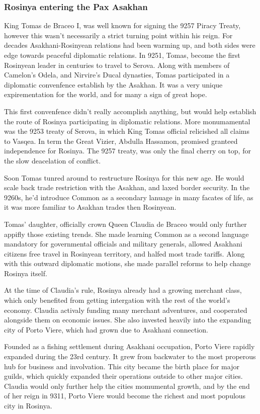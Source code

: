 \documentclass[../main.tex]{subfiles}
\begin{document}
\subsubsection{Rosinya entering the Pax Asakhan}
King Tomas de Braceo I, was well known for signing the 9257 Piracy Treaty, however this wasn't necessarily 
a strict turning point within his reign. For decades Asakhani-Rosinyean relations had been warming up,
and both sides were edge towards peaceful diplomatic relations. In 9251, Tomas, become the first 
Rosinyean leader in centuries to travel to Serova. Along with members of Camelon's Odela, and Nirvire's 
Ducal dynasties, Tomas participated in a diplomatic convenfence establish by the Asakhan. It was a very 
unique expirementation for the world, and for many a sign of great hope. 

This first convenfence didn't really accomplish anything, but would help establish the route of Rosinya 
participating in diplomatic relations. More monumamental was the 9253 treaty of Serova, in which King Tomas
official relicished all claims to Vasqea. In term the Great Vizier, Abdulla Hassamon, promised granteed independence 
for Rosinya. The 9257 treaty, was only the final cherry on top, for the slow deacelation of conflict. 

Soon Tomas tunred around to restructure Rosinya for this new age. He would scale back trade restriction
with the Asakhan, and laxed border security. In the 9260s, he'd introduce Common as a secondary 
lanuage in many facates of life, as it was more familiar to Asakhan trades then Rosinyean. 

Tomas' daughter, officially crown Queen Claudia de Braceo would only further appifly those existing trends.
She made learning Common as a second language mandatory for governmental officials and military generals,
allowed Asakhani citizens free travel in Rosinyean territory, and halfed most trade tariffs. Along with 
this outward diplomatic motions, she made parallel reforms to help change Rosinya itself. 

At the time of Claudia's rule, Rosinya already had a growing merchant class, which only benefited from
getting intergation with the rest of the world's economy. Claudia activaly funding many merchant 
adventures, and cooperated alongside them on economic issues. She also invested heavily into the 
expanding city of Porto Viere, which had grown due to Asakhani connection. 

Founded as a fishing settlement during Asakhani occupation, Porto Viere rapidly expanded during the 
23rd century. It grew from backwater to the most properous hub for business and involvation. This 
city became the birth place for major guilds, which quickly expanded their operations outside to other
major cities. Claudia would only further help the cities momumental growth, and by the end of her reign
in 9311, Porto Viere would become the richest and most populous city in Rosinya. 
\end{document}

